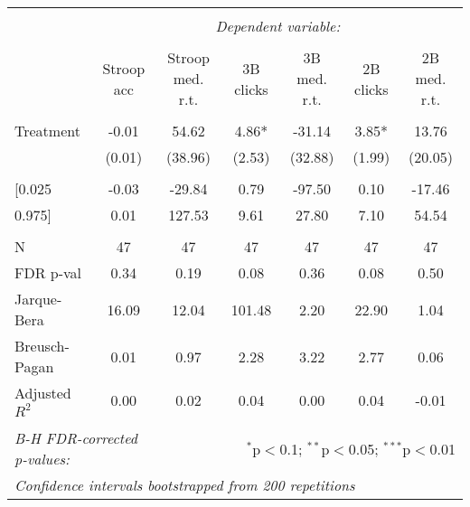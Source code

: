 \documentclass[a4paper,12pt]{article}
\begin{document}
\begin{sidewaystable}
  \caption{}
  \label{tbl:clicks}
\begin{center}
\begin{tabular}{@{\extracolsep{5pt}}lcccccc}
\hline
\hline \\
[-1.8ex] & \multicolumn{6}{c}{\textit{Dependent variable:}} \\
\cline{2-7} \\
[-1.8ex] & Stroop acc & Stroop med. r.t. & 3B clicks & 3B med. r.t. & 2B clicks & 2B med. r.t.  \\
\hline \\ [-1.8ex]
Treatment          & -0.01      & 54.62            & 4.86*     & -31.14       & 3.85*     & 13.76         \\
                 & (0.01)     & (38.96)          & (2.53)    & (32.88)      & (1.99)    & (20.05)       \\
\hline \\ [-1.8ex]
{[}0.025 &            -0.03 &           -29.84 &               0.79 &               -97.50 &             0.10 &             -17.46  \\
0.975{]} &             0.01 &           127.53 &               9.61 &                27.80 &             7.10 &              54.54  \\
\hline \\ [-1.8ex]
N                & 47         & 47               & 47        & 47           & 47        & 47            \\
FDR p-val        & 0.34       & 0.19             & 0.08      & 0.36         & 0.08      & 0.50          \\
Jarque-Bera      & 16.09      & 12.04            & 101.48    & 2.20         & 22.90     & 1.04          \\
Breusch-Pagan    & 0.01       & 0.97             & 2.28      & 3.22         & 2.77      & 0.06          \\
Adjusted $R^2$ & 0.00       & 0.02             & 0.04      & 0.00         & 0.04      & -0.01         \\
\hline
\hline \\[-1.8ex]
\multicolumn{2}{l}{\textit{B-H FDR-corrected p-values:}}  & \multicolumn{5}{r}{$^{*}$p$<$0.1; $^{**}$p$<$0.05; $^{***}$p$<$0.01} \\
\multicolumn{7}{l}{\textit{Confidence intervals bootstrapped from 200 repetitions}}  \\


\end{tabular}
\end{center}
\end{sidewaystable}

\end{document}
